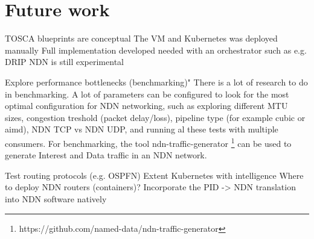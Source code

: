 \section{Future work}\label{fut}
TOSCA blueprints are conceptual
The VM and Kubernetes was deployed manually
Full implementation developed needed with an orchestrator such as e.g. DRIP
NDN is still experimental

Explore performance bottlenecks (benchmarking)" 
There is a lot of research to do in benchmarking. A lot of parameters can be configured to look for the most optimal configuration for NDN networking, such as exploring different MTU sizes, congestion treshold (packet delay/loss), pipeline type (for example cubic or aimd), NDN TCP vs NDN UDP, and running al these tests with multiple consumers. For benchmarking, the tool ndn-traffic-generator \footnote{https://github.com/named-data/ndn-traffic-generator} can be used to generate Interest and Data traffic in an NDN network. 


Test routing protocols (e.g. OSPFN)
Extent Kubernetes with intelligence
Where to deploy NDN routers (containers)?
Incorporate the PID -> NDN translation into NDN software natively